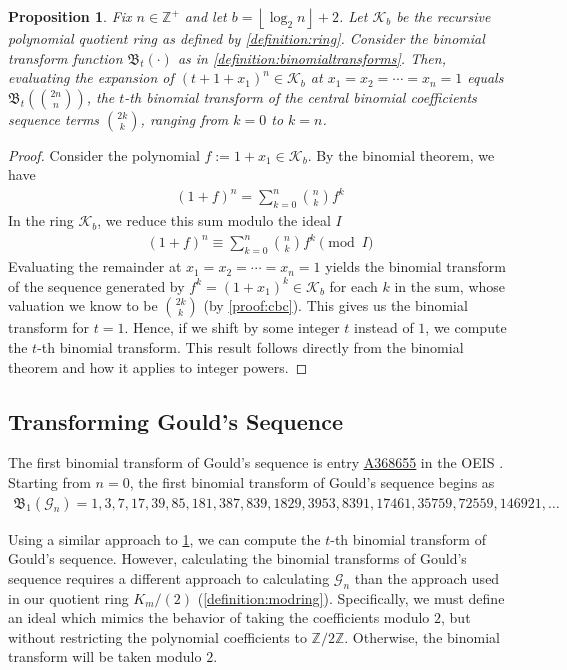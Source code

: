 \documentclass[12pt,reqno]{article}
\theoremstyle{plain}
\newtheorem{proposition}[theorem]{Proposition}
\newcommand{\floor}[1]{\left\lfloor #1 \right\rfloor}
\newcommand{\Z}{\mathbb{Z}}
\newcommand{\K}{\mathcal{K}}
\newcommand{\BT}{\mathfrak{B}}
\newcommand{\Goulds}{\mathcal{G}}
\newcommand{\seqnum}[1]{\href{https://oeis.org/#1}{\rm \underline{#1}}}
\begin{document}
\begin{proposition} \label{proposition:binomialtransforms}
Fix $n \in \Z^+$ and let $b={\floor{\log_2 n}+2}$. Let $\K_b$ be the recursive polynomial quotient ring as defined by \cref{definition:ring}. Consider the binomial transform function $\BT_t(\cdot)$ as in \cref{definition:binomialtransforms}. Then, evaluating the expansion of $(t + 1 + x_1)^n \in \K_b$ at $x_1=x_2=\cdots=x_n=1$ equals $\BT_t(\binom{2n}{n})$, the $t$-th binomial transform of the central binomial coefficients sequence terms $\binom{2k}{k}$, ranging from $k=0$ to $k=n$.
\end{proposition}
\begin{proof}
Consider the polynomial $f := 1 + x_1 \in \K_b$. By the binomial theorem, we have
\begin{align*}
    (1 + f)^n = \sum_{k=0}^{n} \binom{n}{k} f^k
\end{align*}
In the ring $\K_b$, we reduce this sum modulo the ideal $I$
\begin{align*}
    (1 + f)^n \equiv \sum_{k=0}^{n} \binom{n}{k} f^k \pmod{I}
\end{align*}
Evaluating the remainder at $x_1=x_2=\cdots=x_n=1$ yields the binomial transform of the sequence generated by $f^k = (1+x_1)^k \in \K_b$ for each $k$ in the sum, whose valuation we know to be $\binom{2k}{k}$ (by \cref{proof:cbc}). This gives us the binomial transform for $t=1$. Hence, if we shift by some integer $t$ instead of $1$, we compute the $t$-th binomial transform. This result follows directly from the binomial theorem and how it applies to integer powers.
\end{proof}

\subsection{Transforming Gould's Sequence}
The first binomial transform of Gould's sequence is entry \seqnum{A368655} in the OEIS \cite{A368655}. Starting from $n=0$, the first binomial transform of Gould's sequence begins as
\begin{align*}
\BT_{1}(\Goulds_n) = 1, 3, 7, 17, 39, 85, 181, 387, 839, 1829, 3953, 8391, 17461, 35759, 72559, 146921, \ldots
\end{align*}

Using a similar approach to \cref{proposition:binomialtransforms}, we can compute the $t$-th binomial transform of Gould's sequence. However, calculating the binomial transforms of Gould's sequence requires a different approach to calculating $\Goulds_n$ than the approach used in our quotient ring $K_m/(2)$ (\cref{definition:modring}). Specifically, we must define an ideal which mimics the behavior of taking the coefficients modulo $2$, but without restricting the polynomial coefficients to $\Z/2\Z$. Otherwise, the binomial transform will be taken modulo $2$.
\end{document}

